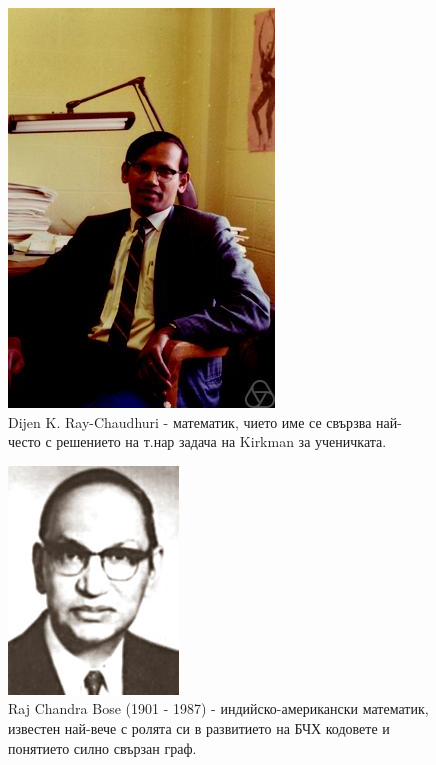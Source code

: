 \documentclass[numbering=fraction]{beamer}
\begin{document}
\begin{frame}
\begin{minipage}[t]{0.45\linewidth}
\begin{figure}
    \centering
    \includegraphics[width=0.5\linewidth]{chaudhui-photo.png}
    \caption{Dijen K. Ray-Chaudhuri - математик, чието име се свързва най-често с решението на т.нар задача на Kirkman за ученичката.}
    \label{fig:chaudhui-photo}
\end{figure}
\end{minipage}%
\hfill
\begin{minipage}[t]{0.45\linewidth}
\begin{figure}
\centering
\includegraphics[width=0.5\linewidth]{bose-photo.png}
\caption{Raj Chandra Bose (1901 - 1987) - индийско-американски математик, известен най-вече с ролята си в развитието на БЧХ кодовете и понятието силно свързан граф.}
\label{fig:bose-photo}
\end{figure}
\end{minipage}
\end{frame}
\end{document}
